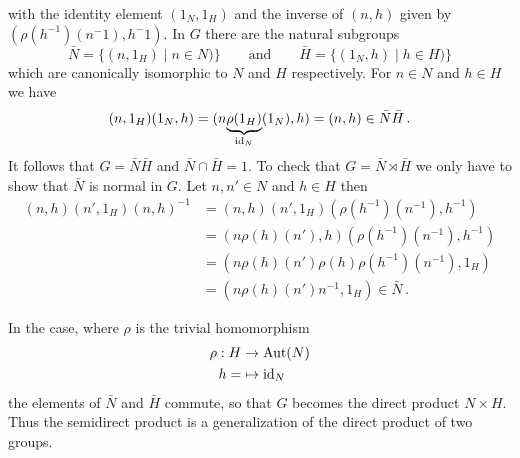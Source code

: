 with the identity element $(1_N,1_H)$ and the inverse of $(n,h)$ given by
$(\rho(h^{-1})(n^-1),h^-1)$. In $G$ there are the natural subgroups
\[
  \bar N=\{(n,1_H)\mid n\in N)\}
  \qquad\text{and}\qquad
  \bar H=\{(1_N,h)\mid h\in H)\}
\]
which are canonically isomorphic to $N$ and $H$ respectively. For $n\in N$ and
$h\in H$ we have
\[
  (n,1_H)(1_N,h)=(n\underset{\operatorname{id}_N}{\underbrace{\rho(1_H)}}(1_N),h)
  =(n,h)\in \bar N\bar H \,.
\]
It follows that $G=\bar N\bar H$ and $\bar N\cap\bar H=1$. To check that
$G=\bar N\rtimes\bar H$ we only have to show that $\bar N$ is normal in $G$.
Let $n,n'\in N$ and $h\in H$ then
\begin{align*}
  (n,h)(n',1_H)(n,h)^{-1}
  &=(n,h)(n',1_H)(\rho(h^{-1})(n^{-1}),h^{-1})
  \\&=(n\rho(h)(n'),h)(\rho(h^{-1})(n^{-1}),h^{-1})
  \\&=(n\rho(h)(n')\rho(h)\rho(h^{-1})(n^{-1}),1_H)
  \\&=(n\rho(h)(n')n^{-1},1_H) \in \bar N \,.
\end{align*}

In the case, where $\rho$ is the trivial homomorphism
\begin{align}
  \rho:H&\to\operatorname{Aut}(N)
\\h=&\mapsto \operatorname{id}_N
\end{align}
the elements of $\bar N$ and $\bar H$ commute, so that $G$ becomes the direct
product $N\times H$. Thus the semidirect product is a generalization of the
direct product of two groups.


